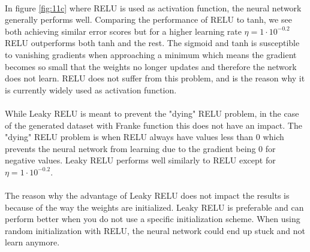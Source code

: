 \documentclass[a4paper,twocolumn]{article}
\begin{document}
\\
In figure \ref{fig:11c} where RELU is used as activation function, the neural network generally performs well. Comparing the performance of RELU to tanh, we see both achieving similar error scores but for a higher learning rate $\eta = 1\cdot 10^{-0.2}$ RELU outperforms both tanh and the rest. The sigmoid and tanh is susceptible to vanishing gradients when approaching a minimum which means the gradient becomes so small that the weights no longer updates and therefore the network does not learn. RELU does not suffer from this problem, and is the reason why it is currently widely used as activation function.\\
\\
While Leaky RELU is meant to prevent the "dying" RELU problem, in the case of the generated dataset with Franke function this does not have an impact. The "dying" RELU problem is when RELU always have values less than 0 which prevents the neural network from learning due to the gradient being 0 for negative values. Leaky RELU performs well similarly to RELU except for $\eta = 1 \cdot 10^{-0.2}$.\\
\\
The reason why the advantage of Leaky RELU does not impact the results is because of the way the weights are initialized. Leaky RELU is preferable and can perform better when you do not use a specific initialization scheme. When using random initialization with RELU, the neural network could end up stuck and not learn anymore.
\end{document}
